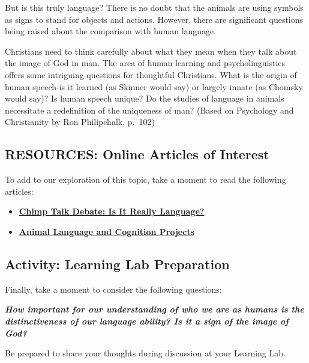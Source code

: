 \documentclass[
]{book}
\begin{document}
But is this truly language? There is no doubt that the animals are using symbols as signs to stand for objects and actions. However, there are significant questions being raised about the comparison with human language.

Christians need to think carefully about what they mean when they talk about the image of God in man. The area of human learning and psycholinguistics offers some intriguing questions for thoughtful Christians. What is the origin of human speech-is it learned (as Skinner would say) or largely innate (as Chomsky would say)? Is human speech unique? Do the studies of language in animals necessitate a redefinition of the uniqueness of man? (Based on Psychology and Christianity by Ron Philipchalk, p.~102)

\hypertarget{resources-online-articles-of-interest-1}{%
\subsection*{RESOURCES: Online Articles of Interest}\label{resources-online-articles-of-interest-1}}

To add to our exploration of this topic, take a moment to read the following articles:

\begin{itemize}
\item
  \href{http://tuvalu.santafe.edu/~johnson/articles.chimp.html}{\textbf{Chimp Talk Debate: Is It Really Language?}}
\item
  \href{https://www.massey.ac.nz/~alock/hbook/ristau.htm}{\textbf{Animal Language and Cognition Projects}}
\end{itemize}

\hypertarget{activity-learning-lab-preparation}{%
\subsection*{Activity: Learning Lab Preparation}\label{activity-learning-lab-preparation}}

\begin{reflect}
Finally, take a moment to consider the following questions:

\textbf{\emph{How important for our understanding of who we are as humans is the distinctiveness of our language ability? Is it a sign of the image of God?}}

Be prepared to share your thoughts during discussion at your Learning Lab.
\end{reflect}
\end{document}
